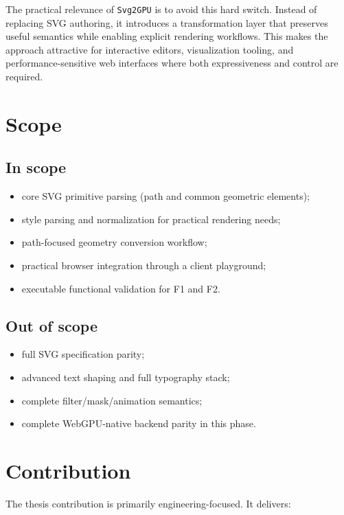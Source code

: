 The practical relevance of \texttt{Svg2GPU} is to avoid this hard switch.
Instead of replacing SVG authoring, it introduces a transformation layer that preserves useful semantics while enabling explicit rendering workflows.
This makes the approach attractive for interactive editors, visualization tooling, and performance-sensitive web interfaces where both expressiveness and control are required.

\section{Scope}

\subsection{In scope}

\begin{itemize}
\item core SVG primitive parsing (path and common geometric elements);
\item style parsing and normalization for practical rendering needs;
\item path-focused geometry conversion workflow;
\item practical browser integration through a client playground;
\item executable functional validation for F1 and F2.
\end{itemize}

\subsection{Out of scope}

\begin{itemize}
\item full SVG specification parity;
\item advanced text shaping and full typography stack;
\item complete filter/mask/animation semantics;
\item complete WebGPU-native backend parity in this phase.
\end{itemize}

\section{Contribution}

The thesis contribution is primarily engineering-focused.
It delivers:

